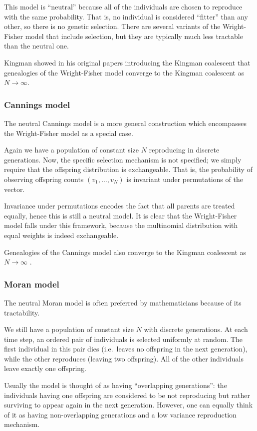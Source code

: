 \documentclass[fleqn]{article}
\theoremstyle{definition}
\begin{document}
This model is ``neutral'' because all of the individuals are chosen to reproduce with the same probability. That is, no individual is considered ``fitter'' than any other, so there is no genetic selection. There are several variants of the Wright-Fisher model that include selection, but they are typically much less tractable than the neutral one.

Kingman showed in his original papers introducing the Kingman coalescent \citep{kingman1982gene} that genealogies of the Wright-Fisher model converge to the Kingman coalescent as $N\to\infty$.

\subsubsection{Cannings model}
The neutral Cannings model \citep{cannings1974, cannings1975} is a more general construction which encompasses the Wright-Fisher model as a special case.

Again we have a population of constant size $N$ reproducing in discrete generations.
Now, the specific selection mechanism is not specified; we simply require that the offspring distribution is exchangeable. That is, the probability of observing offspring counts $(v_1, \dots, v_N)$ is invariant under permutations of the vector.

Invariance under permutations encodes the fact that all parents are treated equally, hence this is still a neutral model.
It is clear that the Wright-Fisher model falls under this framework, because the multinomial distribution with equal weights is indeed exchangeable.

Genealogies of the Cannings model also converge to the Kingman coalescent as $N\to\infty$ \citep[Section 2.2]{etheridge2011}.

\subsubsection{Moran model}
The neutral Moran model \citep{moran1958} is often preferred by mathematicians because of its tractability.

We still have a population of constant size $N$ with discrete generations.
At each time step, an ordered pair of individuals is selected uniformly at random. The first individual in this pair dies (i.e.\ leaves no offspring in the next generation), while the other reproduces (leaving two offspring). All of the other individuals leave exactly one offspring.

Usually the model is thought of as having ``overlapping generations'': the individuals having one offspring are considered to be not reproducing but rather surviving to appear again in the next generation.
However, one can equally think of it as having non-overlapping generations and a low variance reproduction mechanism.
\end{document}
